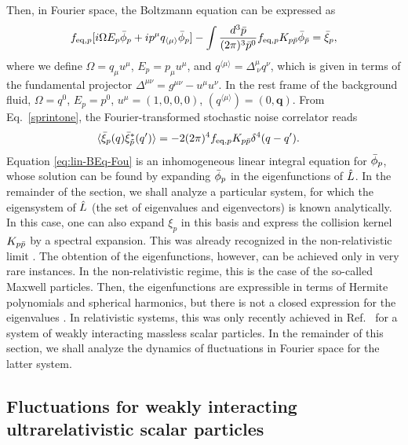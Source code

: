 \documentclass[aps,prd,preprint,nofootinbib,amsmath,amssymb,showpacs,longbibliography,singlecolumn,superscriptaddress,10pt]{revtex4-1}
\theoremstyle{plain}
\theoremstyle{definition}
\begin{document}
%
Then, in Fourier space, the Boltzmann equation can be expressed as 
%
\begin{equation}
\label{eq:lin-BEq-Fou}
f_{\mathrm{eq},p} [i \Omega E_p  \Bar{\phi}_{p} + i p^{\mu} q_{\langle \mu \rangle} \Bar{\phi}_{p}]  
-
\int \dfrac{d^3 \Bar{p}}{(2\pi)^3 \Bar{p}^0} f_{\text{eq},p} K_{p\Bar{p}} \Bar{\phi}_{\Bar{p}} =  \Bar{\xi}_p ,
\end{equation}
%
where we define $\Omega = q_{\mu} u^{\mu}$,  $E_p = p_{\mu} u^{\mu}$, and $q^{\langle \mu \rangle} = \Delta^{\mu}_{\ \nu}q^{\nu}$, which is given in terms of the fundamental projector $\Delta^{\mu \nu} = g^{\mu \nu} - u^{\mu} u^{\nu}$. In the rest frame of the background fluid, $\Omega = q^{0}$, $E_{p} = p^{0}$, $u^{\mu} = (1,0,0,0)$, $(q^{\langle \mu \rangle}) = (0, \mathbf{q}) $.  From Eq.~\eqref{sprintone}, the Fourier-transformed stochastic noise correlator reads 
%
\begin{equation}
\label{eq:Fourier-correlators-Xi}
\begin{aligned}
&
\langle \Bar{\xi}_{p}(q) \Bar{\xi}^{*}_{\tilde{p}}(q') \rangle = - 2 (2 \pi)^{4} f_{\text{eq},p} K_{p \Bar{p}} \delta^{4}(q-q').
\end{aligned}    
\end{equation}
%
Equation \eqref{eq:lin-BEq-Fou} is an inhomogeneous linear integral equation for $\Bar{\phi}_{p}$, whose solution can be found by expanding $\Bar{\phi}_{p}$ in the eigenfunctions of $\Hat{L}$. In the remainder of the section, we shall analyze a particular system, for which the eigensystem of $\Hat{L}$ (the set of eigenvalues and eigenvectors) is known analytically.  In this case, one can also expand $\xi_{p}$ in this basis and express the collision kernel $K_{p \Bar{p}}$ by a spectral expansion. This was already recognized in the non-relativistic limit \cite{fox1970contributions}. The obtention of the eigenfunctions, however, can be achieved only in very rare instances. In the non-relativistic regime, this is the case of the so-called Maxwell particles. Then, the eigenfunctions are expressible in terms of Hermite polynomials and spherical harmonics, but there is not a closed expression for the eigenvalues \cite{chang1952propagation,cercignani:90mathematical}. In relativistic systems, this was only recently achieved in Ref.~\cite{Denicol:2022bsq} for a system of weakly interacting massless scalar particles. In the remainder of this section, we shall analyze the dynamics of fluctuations in Fourier space for the latter system.


\subsection{Fluctuations for weakly interacting ultrarelativistic scalar particles}
\end{document}
